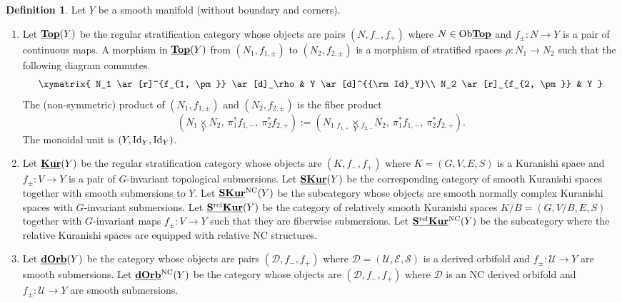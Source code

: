 \documentclass[reqno, 10pt]{amsart}
\numberwithin{equation}{section}
\numberwithin{equation}{section}
\theoremstyle{definition}
\newtheorem{defn}[thm]{Definition}
\theoremstyle{remark}
\newcommand{\beqn}{\begin{equation*}}
\newcommand{\eeqn}{\end{equation*}}
\newcommand{\mc}{\mathcal}
\newcommand{\uds}[1]{\underline{\smash{#1}}}
\begin{document}
\begin{defn}\label{defn191}
Let $Y$ be a smooth manifold (without boundary and corners).
\begin{enumerate}

\item Let $\uds{\bf Top}(Y)$ be the regular stratification category whose objects are pairs $(N, f_-, f_+)$ where $N\in {\rm Ob} \uds{\bf Top}$ and $f_\pm: N \to Y$ is a pair of continuous maps. A morphism in $\uds{\bf Top}(Y)$ from $(N_1, f_{1, \pm})$ to $(N_2, f_{2, \pm})$ is a morphism of stratified spaces $\rho: N_1 \to N_2$ such that the following diagram commutes.
\beqn
\xymatrix{ N_1 \ar[r]^{f_{1, \pm}} \ar[d]_\rho & Y \ar[d]^{{\rm Id}_Y}\\
           N_2 \ar[r]_{f_{2, \pm}} & Y }
\eeqn
The  (non-symmetric) product of $(N_1, f_{1, \pm})$ and $(N_2, f_{2, \pm})$ is the fiber product
\beqn
\left( N_1 \underset{Y}{\times} N_2,\ \pi_1^* f_{1, -}, \ \pi_2^* f_{2, +} \right):= \left( N_1\ {}_{f_{1, +}}\underset{Y}{\times}{}_{f_{2, -}} N_2,\ \pi_1^* f_{1, -},\ \pi_2^* f_{2, +} \right).
\eeqn
The monoidal unit is $(Y, {\rm Id}_Y, {\rm Id}_Y)$. 

\item Let $\uds{\bf Kur}(Y)$ be the regular stratification category whose objects are $(K, f_-, f_+)$ where $K = (G, V, E, S)$ is a Kuranishi space and $f_\pm: V \to Y$ is a pair of $G$-invariant topological submersions. Let $\uds{\bf SKur}(Y)$ be the corresponding category of smooth Kuranishi spaces together with smooth submersions to $Y$. Let $\uds{\bf SKur}^{\rm NC}(Y)$ be the subcategory whose objects are smooth normally complex Kuranishi spaces with $G$-invariant submersions. Let $\uds{\bf S^{\rm rel} Kur}(Y)$ be the category of relatively smooth Kuranishi spaces $K/B = (G, V/B, E, S)$ together with $G$-invariant maps $f_\pm: V \to Y$ such that they are fiberwise submersions. Let $\uds{\bf S^{\rm rel}Kur}^{\rm NC}(Y)$ be the subcategory where the relative Kuranishi spaces are equipped with relative NC structures. 

\item Let $\uds{\bf dOrb}(Y)$ be the category whose objects are pairs $({\mc D}, f_-, f_+)$ where ${\mc D} = ({\mc U}, {\mc E}, {\mc S})$ is a derived orbifold and $f_\pm: {\mc U} \to Y$ are smooth submersions. Let $\uds{\bf dOrb}^{\rm NC}(Y)$ be the category whose objects are $({\mc D}, f_-, f_+)$ where ${\mc D}$ is an NC derived orbifold and $f_\pm: {\mc U} \to Y$ are smooth submersions.

\end{enumerate}
\end{defn}
\end{document}
